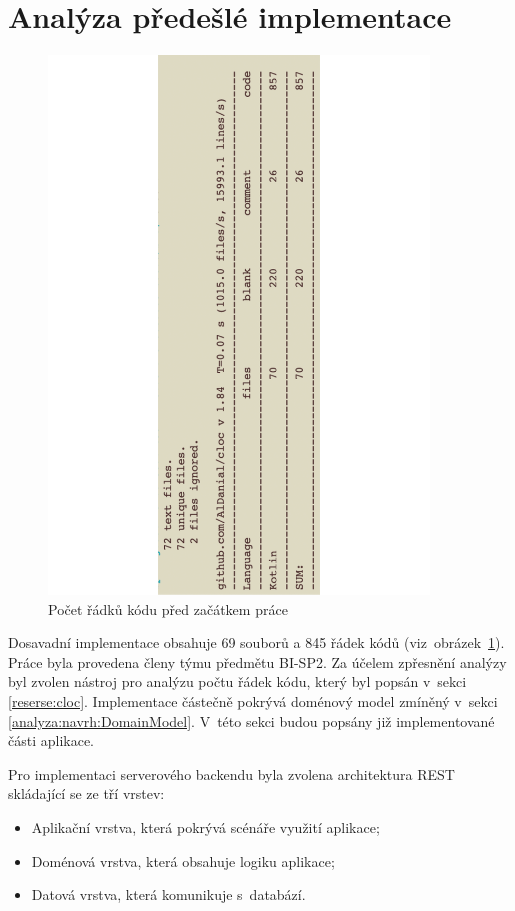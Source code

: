 \section{Analýza předešlé implementace}\label{analyza:soucasnaImplementace}
    \begin{figure}\centering
	   \includegraphics[angle=-90, width=0.9\textwidth]{pdfs/Cloc1}
	   \caption[Počet řádků kódu před začátkem práce]{Počet řádků kódu před začátkem práce}\label{image:cloc1}
    \end{figure}
    Dosavadní implementace obsahuje 69 souborů a 845 řádek kódů (viz~obrázek~\ref{image:cloc1}). Práce byla provedena členy týmu předmětu BI-SP2. Za účelem zpřesnění analýzy byl zvolen nástroj pro analýzu počtu řádek kódu, který byl popsán v~sekci \ref{reserse:cloc}. Implementace částečně pokrývá doménový model zmíněný v~sekci \ref{analyza:navrh:DomainModel}. V~této sekci budou popsány již implementované části aplikace. 
     
    Pro implementaci serverového backendu byla zvolena architektura REST skládající se ze tří vrstev:
    \begin{itemize}
         \item Aplikační vrstva, která pokrývá scénáře využití aplikace;
         \item Doménová vrstva, která obsahuje logiku aplikace;
         \item Datová vrstva, která komunikuje s~databází.
    \end{itemize}
    
